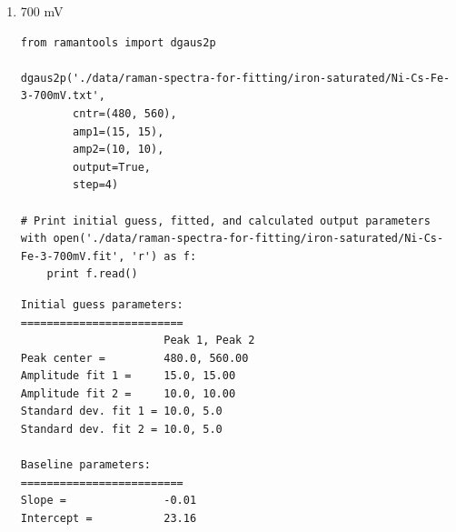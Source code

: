 \documentclass[journal=jpccck,manuscript=suppinfo,email=true]{achemso}
\begin{document}
\begin{enumerate}
\begin{enumerate}
\begin{enumerate}
\begin{verbatim}
dgaus2p('./data/raman-spectra-for-fitting/iron-saturated/Ni-Cs-Fe-3-600mV.txt',
        cntr=(480, 560),
        amp1=(12, 12),
        amp2=(10, 10),
        output=True,
        step=4)

# Print initial guess, fitted, and calculated output parameters
with open('./data/raman-spectra-for-fitting/iron-saturated/Ni-Cs-Fe-3-600mV.fit', 'r') as f:
    print f.read()
\end{verbatim}

\begin{verbatim}
Initial guess parameters:
=========================
                      Peak 1, Peak 2
Peak center =         480.0, 560.00
Amplitude fit 1 =     12.0, 12.00
Amplitude fit 2 =     10.0, 10.00
Standard dev. fit 1 = 10.0, 5.0
Standard dev. fit 2 = 10.0, 5.0

Fitted parameters:
==================
                      Peak 1, Peak 2
Peak center =         477.5, 556.31
Amplitude fit 1 =     6.7, 18.87
Amplitude fit 2 =     6.3, 7.19
Standard dev. fit 1 = 31.9, 8.3
Standard dev. fit 2 = 28.7, 5.6

Calculation output:
======================
Mean peak 1 =         477.5 \pm 0.25
Mean peak 2 =         556.3 \pm 0.51
Height peak 1 =       42.0 \pm 0.40
Height peak 2 =       29.0 \pm 0.47
Area peak 1 =         1320.7
Area peak 2 =         778.5
\end{verbatim}

\item 700 mV
\label{sec-4-2-0-2-3-2}
\begin{verbatim}
from ramantools import dgaus2p

dgaus2p('./data/raman-spectra-for-fitting/iron-saturated/Ni-Cs-Fe-3-700mV.txt',
        cntr=(480, 560),
        amp1=(15, 15),
        amp2=(10, 10),
        output=True,
        step=4)

# Print initial guess, fitted, and calculated output parameters
with open('./data/raman-spectra-for-fitting/iron-saturated/Ni-Cs-Fe-3-700mV.fit', 'r') as f:
    print f.read()
\end{verbatim}

\begin{verbatim}
Initial guess parameters:
=========================
                      Peak 1, Peak 2
Peak center =         480.0, 560.00
Amplitude fit 1 =     15.0, 15.00
Amplitude fit 2 =     10.0, 10.00
Standard dev. fit 1 = 10.0, 5.0
Standard dev. fit 2 = 10.0, 5.0

Baseline parameters:
=========================
Slope =               -0.01
Intercept =           23.16


\end{verbatim}
\end{enumerate}
\end{enumerate}
\end{enumerate}
\end{document}
